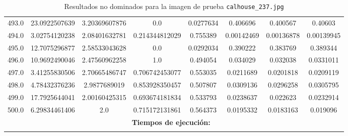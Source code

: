\begin{longtable}{|c|c|c|c|c|c|c|c|}
493.0 & 23.0922507639 & 3.20369607876 & 0.0 & 0.0277634 & 0.406696 & 0.400567 & 0.40603 \\
494.0 & 3.02754120238 & 2.08401632781 & 0.214344812029 & 0.755389 & 0.00142469 & 0.00136878 & 0.00139945 \\
495.0 & 12.7075296877 & 2.58533043628 & 0.0 & 0.0292034 & 0.390222 & 0.383769 & 0.389344 \\
496.0 & 10.9692490046 & 2.47560962258 & 1.0 & 0.494054 & 0.034029 & 0.032038 & 0.0331011 \\
497.0 & 3.41255830506 & 2.70665486747 & 0.706742453077 & 0.553035 & 0.0211689 & 0.0201818 & 0.0209119 \\
498.0 & 4.78432376236 & 2.9877689019 & 0.853928350457 & 0.507807 & 0.0309136 & 0.0296258 & 0.0305795 \\
499.0 & 17.7925644041 & 2.00160425315 & 0.693674181834 & 0.533793 & 0.0238637 & 0.022623 & 0.0232914 \\
500.0 & 6.29834461406 & 2.0 & 0.715172131861 & 0.564373 & 0.0195332 & 0.0183163 & 0.019096 \\	
\multicolumn{8}{|c|}{\textbf{Tiempos de ejecución:} \texttt{
}}\\  \hline
\caption{Resultados no dominados para la imagen de prueba \texttt{calhouse\_237.jpg}}
\label{tab:calhouse_237}
\end{longtable}
\normalsize

